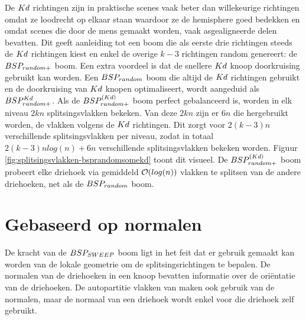 De $Kd$ richtingen zijn in praktische scenes vaak beter dan willekeurige richtingen omdat ze loodrecht op elkaar staan waardoor ze de hemisphere goed bedekken en omdat scenes die door de mens gemaakt worden, vaak asgealigneerde delen bevatten.
Dit geeft aanleiding tot een boom die als eerste drie richtingen steeds de $Kd$ richtingen kiest en enkel de overige $k - 3$ richtingen random genereert: de $BSP_{random+}$ boom. Een extra voordeel is dat de snellere $Kd$ knoop doorkruising gebruikt kan worden. Een $BSP_{random}$ boom die altijd de $Kd$ richtingen gebruikt en de doorkruising van $Kd$ knopen optimaliseert, wordt aangeduid als $BSP^{Kd}_{random+}$. 
Als de $BSP^{(Kd)}_{random+}$ boom perfect gebalanceerd is, worden in elk niveau $2kn$ splitsingsvlakken bekeken.
Van deze $2kn$ zijn er $6n$ die hergebruikt worden, de vlakken volgens de $Kd$ richtingen.
Dit zorgt voor $2(k-3)n$ verschillende splitsingsvlakken per niveau, zodat in totaal $2(k-3)nlog(n) + 6n$ verschillende splitsingsvlakken bekeken worden.
Figuur \ref{fig:splitsingsvlakken-bsprandomsomekd} toont dit visueel.
De $BSP^{(Kd)}_{random+}$ boom probeert elke driehoek via gemiddeld $\mathcal{O}(log(n))$ vlakken te splitsen van de andere driehoeken, net als  de $BSP_{random}$ boom.\\



\section{Gebaseerd op normalen}
    De kracht van de $BSP_{SWEEP}$ boom ligt in het feit dat er gebruik gemaakt kan worden van de lokale geometrie om de splitsingsrichtingen te bepalen.
    De normalen van de driehoeken in een knoop bevatten informatie over de oriëntatie van de driehoeken.
    De autopartitie vlakken van \authorIze{} maken ook gebruik van de normalen, maar de normaal van een driehoek wordt enkel voor die driehoek zelf gebruikt.
    
